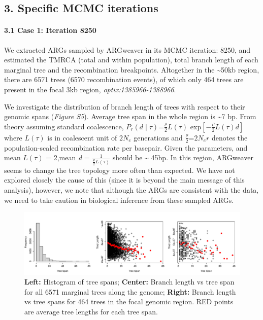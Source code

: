 \documentclass[
]{article}
\begin{document}
\hypertarget{specific-mcmc-iterations}{%
\subsection{3. Specific MCMC
iterations}\label{specific-mcmc-iterations}}

\hypertarget{case-1-iteration-8250}{%
\paragraph{\texorpdfstring{3.1 Case 1: Iteration 8250\\
}{3.1 Case 1: Iteration 8250 }}\label{case-1-iteration-8250}}
\hfill\break
We extracted ARGs sampled by ARGweaver in its MCMC iteration: 8250, and
estimated the TMRCA (total and within population), total branch length
of each marginal tree and the recombination breakpoints. Altogether in
the \textasciitilde50kb region, there are 6571 trees (6570 recombination
events), of which only 464 trees are present in the focal 3kb region,
\emph{optix:1385966-1388966}.

We investigate the distribution of branch length of trees with respect
to their genomic spans (\emph{Figure S5}). Average tree span in the
whole region is \textasciitilde7 bp. From theory assuming standard
coalescence, \(P_r(d \mid \tau)\)=\(\frac {\rho}{2}L(\tau)\)
exp\([-\frac {\rho}{2}L(\tau) d]\) where \(L(\tau)\) is in coalescent
unit of \(2N_e\) generations and \(\frac {\rho}{2}\)=\(2N_er\) denotes
the population-scaled recombination rate per basepair. Given the
parameters, and mean \(L(\tau)\) = 2,mean \emph{d} =
\(\frac {1} {\frac {\rho}{2}L(\tau)}\) should be \textasciitilde{} 45bp.
In this region, ARGweaver seems to change the tree topology more often
than expected. We have not explored closely the cause of this (since it
is beyond the main message of this analysis), however, we note that
although the ARGs are consistent with the data, we need to take caution
in biological inference from these sampled ARGs.

\begin{figure}

{\centering \includegraphics{figS5-1} 

}

\caption{ \footnotesize \textbf{Left:} Histogram of tree spans; \textbf{Center:} Branch length vs tree span for all 6571 marginal trees along the genome; \textbf{Right:} Branch length vs tree spans for 464 trees in the focal genomic region. RED points are average tree lengths for each tree span.}\label{fig:figS5}
\end{figure}
\end{document}
